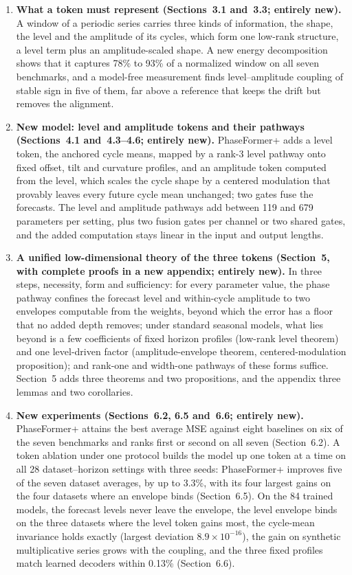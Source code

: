 \documentclass[11pt,a4paper]{letter}
\begin{document}
\begin{letter}
\begin{enumerate}[leftmargin=1.4em,itemsep=0.2em,topsep=0.2em]
\item \textbf{What a token must represent (Sections~3.1 and~3.3; entirely new).} A window of a periodic series carries three kinds of information, the shape, the level and the amplitude of its cycles, which form one low-rank structure, a level term plus an amplitude-scaled shape. A new energy decomposition shows that it captures 78\% to 93\% of a normalized window on all seven benchmarks, and a model-free measurement finds level--amplitude coupling of stable sign in five of them, far above a reference that keeps the drift but removes the alignment.

\item \textbf{New model: level and amplitude tokens and their pathways (Sections~4.1 and~4.3--4.6; entirely new).} PhaseFormer+ adds a level token, the anchored cycle means, mapped by a rank-3 level pathway onto fixed offset, tilt and curvature profiles, and an amplitude token computed from the level, which scales the cycle shape by a centered modulation that provably leaves every future cycle mean unchanged; two gates fuse the forecasts. The level and amplitude pathways add between 119 and 679 parameters per setting, plus two fusion gates per channel or two shared gates, and the added computation stays linear in the input and output lengths.

\item \textbf{A unified low-dimensional theory of the three tokens (Section~5, with complete proofs in a new appendix; entirely new).} In three steps, necessity, form and sufficiency: for every parameter value, the phase pathway confines the forecast level and within-cycle amplitude to two envelopes computable from the weights, beyond which the error has a floor that no added depth removes; under standard seasonal models, what lies beyond is a few coefficients of fixed horizon profiles (low-rank level theorem) and one level-driven factor (amplitude-envelope theorem, centered-modulation proposition); and rank-one and width-one pathways of these forms suffice. Section~5 adds three theorems and two propositions, and the appendix three lemmas and two corollaries.

\item \textbf{New experiments (Sections~6.2, 6.5 and~6.6; entirely new).} PhaseFormer+ attains the best average MSE against eight baselines on six of the seven benchmarks and ranks first or second on all seven (Section~6.2). A token ablation under one protocol builds the model up one token at a time on all 28 dataset--horizon settings with three seeds: PhaseFormer+ improves five of the seven dataset averages, by up to 3.3\%, with its four largest gains on the four datasets where an envelope binds (Section~6.5). On the 84 trained models, the forecast levels never leave the envelope, the level envelope binds on the three datasets where the level token gains most, the cycle-mean invariance holds exactly (largest deviation $8.9\times10^{-16}$), the gain on synthetic multiplicative series grows with the coupling, and the three fixed profiles match learned decoders within 0.13\% (Section~6.6).


\end{enumerate}
\end{letter}
\end{document}
